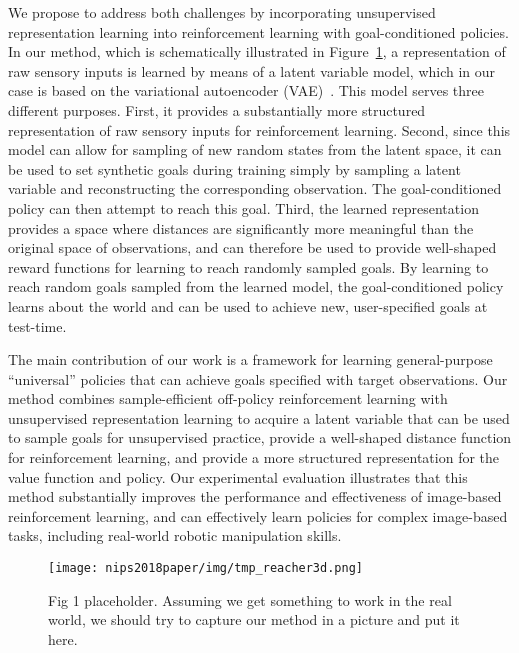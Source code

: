 We propose to address both challenges by incorporating unsupervised representation learning into reinforcement learning with goal-conditioned policies. In our method, which is schematically illustrated in Figure~\ref{fig:fig1}, a representation of raw sensory inputs is learned by means of a latent variable model, which in our case is based on the variational autoencoder (VAE)~\cite{something}. This model serves three different purposes. First, it provides a substantially more structured representation of raw sensory inputs for reinforcement learning. Second, since this model can allow for sampling of new random states from the latent space, it can be used to set synthetic goals during training simply by sampling a latent variable and reconstructing the corresponding observation. The goal-conditioned policy can then attempt to reach this goal. Third, the learned representation provides a space where distances are significantly more meaningful than the original space of observations, and can therefore be used to provide well-shaped reward functions for learning to reach randomly sampled goals. By learning to reach random goals sampled from the learned model, the goal-conditioned policy learns about the world and can be used to achieve new, user-specified goals at test-time.

The main contribution of our work is a framework for learning general-purpose ``universal'' policies that can achieve goals specified with target observations. Our method combines sample-efficient off-policy reinforcement learning with unsupervised representation learning to acquire a latent variable that can be used to sample goals for unsupervised practice, provide a well-shaped distance function for reinforcement learning, and provide a more structured representation for the value function and policy. Our experimental evaluation illustrates that this method substantially improves the performance and effectiveness of image-based reinforcement learning, and can effectively learn policies for complex image-based tasks, including real-world robotic manipulation skills.

\begin{figure}
    \centering
    \texttt{[image: nips2018paper/img/tmp\_reacher3d.png]}
    \caption{Fig 1 placeholder. Assuming we get something to work in the real world, we should try to capture our method in a picture and put it here.}
    \label{fig:fig1}
\end{figure}

